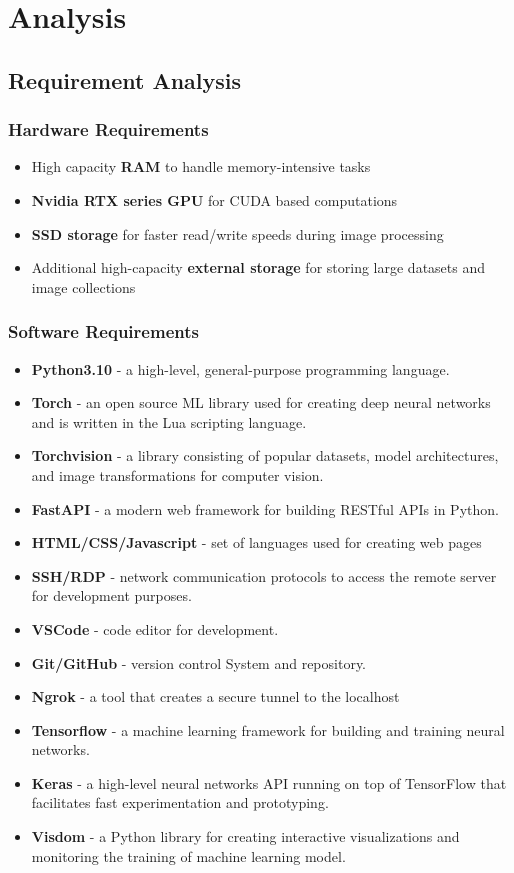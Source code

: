 \setcounter{page}{9}
\chapter{Analysis}

\section{Requirement Analysis}
\subsection{Hardware Requirements}
\begin{itemize}
    \item   High capacity \textbf{RAM} to handle memory-intensive tasks
    \item   \textbf{Nvidia RTX series GPU} for CUDA based computations
    \item   \textbf{SSD storage} for faster read/write speeds during image processing
    \item   Additional high-capacity \textbf{external storage} for storing large datasets and image collections
\end{itemize}

\subsection{Software Requirements}
\begin{itemize}
    \item \textbf{Python3.10} - a high-level, general-purpose programming language.
    \item \textbf{Torch} - an open source ML library used for creating deep neural networks and is written in the Lua scripting language.
    \item \textbf{Torchvision} - a library consisting of popular datasets, model architectures, and image transformations for computer vision.
    \item  \textbf{FastAPI} - a modern web framework for building RESTful APIs in Python.
    \item \textbf{HTML/CSS/Javascript} - set of languages used for creating web pages
    \item  \textbf{SSH/RDP} - network communication protocols to access the remote server for development purposes.
    \item  \textbf{VSCode} - code editor for development.
    \item  \textbf{Git/GitHub} - version control System and repository.
    \item \textbf{Ngrok} - a tool that creates a secure tunnel to the localhost
    \item \textbf{Tensorflow} - a machine learning framework for building and training neural networks.
    \item \textbf{Keras} - a high-level neural networks API running on top of TensorFlow that facilitates fast experimentation and prototyping.
    \item \textbf{Visdom} - a Python library for creating interactive visualizations and monitoring the training of machine learning model.
\end{itemize}
\pagebreak

